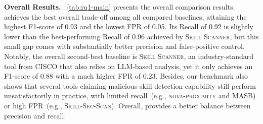 \begin{table}[t]
\centering
\caption{Detection effectiveness on MalSkillsBench. The best results for each metric are highlighted with \textcolor{red}{red}, and the second-best results are highlighted with \textcolor{blue}{blue}. For FPR, lower values indicate better performance.}
\label{tab:rq1-main}
\end{table}

\noindent \textbf{Overall Results.}
~\autoref{tab:rq1-main} presents the overall comparison results. \toolname achieves the best overall trade-off among all compared baselines, attaining the highest F1-score of 0.93 and the lowest FPR of 0.05. Its Recall of 0.92 is slightly lower than the best-performing Recall of 0.96 achieved by \textsc{Skill Scanner}, but this small gap comes with substantially better precision and false-positive control. Notably, the overall second-best baseline is \textsc{Skill Scanner}, an industry-standard tool from CISCO that also relies on LLM-based analysis, yet it only achieves an F1-score of 0.88 with a much higher FPR of 0.23. Besides, our benchmark also shows that several tools claiming malicious-skill detection capability still perform unsatisfactorily in practice, with limited recall~(e.g., \textsc{nova-proximity} and \textsc{MASB}) or high FPR~(e.g., \textsc{Skill-Sec-Scan}). Overall, \toolname provides a better balance between precision and recall.


